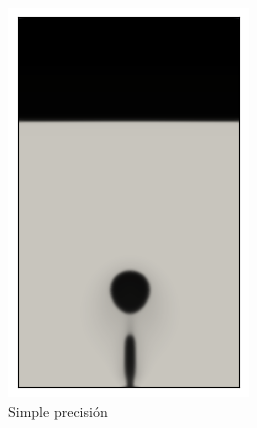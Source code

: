 \begin{figure}[H]
\centering
	\begin{subfigure}{0.35\textwidth}
		\includegraphics[width=\linewidth]{figs/cap4/cuda_bb_760_s25}
		\caption{Simple precisión}
		\label{fig:bb_sp_760}\hfil
	\end{subfigure}
	\begin{subfigure}{0.35\textwidth}

\end{subfigure}
\end{figure}

